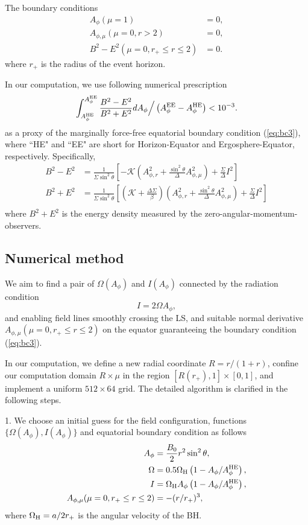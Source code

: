 \documentclass[aps,prd,reprint,nofootinbib, superscriptaddress]{revtex4-1}
\def\sst{\sin^2\theta}
\def\Ap{A_\phi}
\def\Ar{A_{\phi,r}}
\def\Am{A_{\phi,\mu}}
\def\be{\begin{equation}}
\def\ee{\end{equation}}
\def\WH{\Omega_{\rm H}}
\def\AHE{A_\phi^{\rm HE}}
\begin{document}
The boundary conditions
\begin{subequations}
\begin{align}
    A_\phi(\mu = 1) &= 0,  \label{eq:bc1}\\
    \Am(\mu = 0, r > 2) &= 0, \label{eq:bc2}\\
    B^2-E^2 (\mu = 0, r_+ \leq r \leq 2) &=0.\label{eq:bc3}
\end{align}
\end{subequations}
where $r_+$ is the radius of the event horizon.

In our computation, we use following numerical prescription
\be
\label{eq:nbc}
\int_{A_\phi^{\rm HE}}^{A_\phi^{\rm EE}} \frac{B^2-E^2}{B^2+E^2} dA_\phi \Big/ \left(A_\phi^{\rm EE}- A_\phi^{\rm HE}\right)  < 10^{-3}.
\ee
as a proxy of the marginally force-free equatorial boundary condition (\ref{eq:bc3}),
where ``HE" and ``EE" are short for Horizon-Equator and Ergosphere-Equator, respectively.
Specifically,
\be
\begin{aligned}
B^2-E^2 &= \frac{1}{\Sigma \sst} \left[ -\mathcal{K} \left(\Ar^2 +\frac{\sst}{\Delta}\Am^2 \right)+\frac{\Sigma}{\Delta}I^2\right]\\
B^2+E^2 &= \frac{1}{\Sigma \sst} \left[ \left(\mathcal{K}+\frac{\Delta\Sigma}{\beta} \right) \left(\Ar^2 +\frac{\sst}{\Delta}\Am^2 \right)+\frac{\Sigma}{\Delta}I^2\right]\\
\end{aligned}
\ee
where $B^2+E^2$ is the energy density measured by the zero-angular-momentum-observers.

\subsection{Numerical method}
We aim to find a pair of $\Omega(A_\phi)$ and $I(A_\phi)$ connected by the radiation condition
\be I = 2\Omega A_\phi, \label{eq:rad}\ee
and enabling field lines smoothly crossing the LS,
and suitable normal derivative $\Am(\mu =0, r_+\leq r \leq 2)$ on the equator
guaranteeing the boundary condition (\ref{eq:bc3}).

In our computation, we define a new radial coordinate $R=r/(1+r)$, confine our
computation domain $R\times \mu$ in the region $[R(r_+), 1]\times [0,1]$,
and implement a uniform $512\times 64$ grid. The detailed algorithm is clarified
in the following steps.

1. We choose an initial guess for the field configuration, functions
$\{ \Omega(\Ap), I(\Ap)\}$
and equatorial boundary condition as follows
\begin{subequations}
\begin{align}
    \Ap &= \frac{B_0}{2}r^2 \sst,  \label{eq:gss1} \\
    \Omega & = 0.5\WH\left(1-\Ap/\AHE\right),  \label{eq:gss2}\\
    I & = \WH \Ap\left(1-\Ap/\AHE\right) , \\
    \Am(\mu =0, r_+\leq r \leq 2) & = - (r/r_+)^3, \label{eq:gss3}
\end{align}
\end{subequations}
where $\WH = a/2r_+$ is the angular velocity of the BH.
\end{document}
